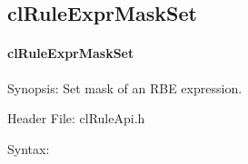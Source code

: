 \begin{flushleft}
\subsection{clRuleExprMaskSet}
\hypertarget{pagerule111}{}\paragraph{cl\-Rule\-Expr\-Mask\-Set}\label{pagerule111}
\begin{Desc}
\item[Synopsis:]Set mask of an RBE expression.\end{Desc}
\begin{Desc}
\item[Header File:]clRuleApi.h\end{Desc}
\begin{Desc}
\item[Syntax:]


\end{Desc}
\end{flushleft}
